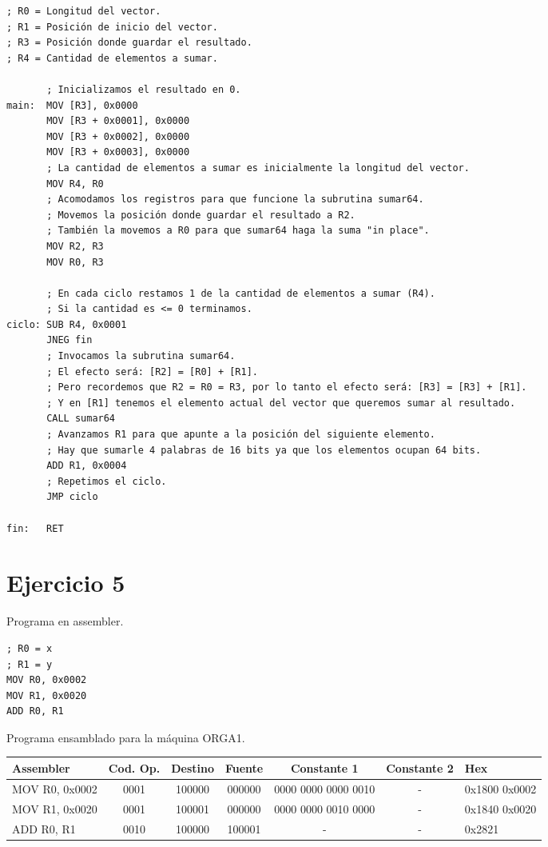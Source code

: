 \begin{lstlisting}
; R0 = Longitud del vector.
; R1 = Posición de inicio del vector.
; R3 = Posición donde guardar el resultado.
; R4 = Cantidad de elementos a sumar.

       ; Inicializamos el resultado en 0.
main:  MOV [R3], 0x0000
       MOV [R3 + 0x0001], 0x0000
       MOV [R3 + 0x0002], 0x0000
       MOV [R3 + 0x0003], 0x0000
       ; La cantidad de elementos a sumar es inicialmente la longitud del vector.
       MOV R4, R0
       ; Acomodamos los registros para que funcione la subrutina sumar64.
       ; Movemos la posición donde guardar el resultado a R2.
       ; También la movemos a R0 para que sumar64 haga la suma "in place".
       MOV R2, R3
       MOV R0, R3

       ; En cada ciclo restamos 1 de la cantidad de elementos a sumar (R4).
       ; Si la cantidad es <= 0 terminamos.
ciclo: SUB R4, 0x0001
       JNEG fin
       ; Invocamos la subrutina sumar64.
       ; El efecto será: [R2] = [R0] + [R1].
       ; Pero recordemos que R2 = R0 = R3, por lo tanto el efecto será: [R3] = [R3] + [R1].
       ; Y en [R1] tenemos el elemento actual del vector que queremos sumar al resultado.
       CALL sumar64
       ; Avanzamos R1 para que apunte a la posición del siguiente elemento.
       ; Hay que sumarle 4 palabras de 16 bits ya que los elementos ocupan 64 bits.
       ADD R1, 0x0004
       ; Repetimos el ciclo.
       JMP ciclo

fin:   RET
\end{lstlisting}

\section{Ejercicio 5}

Programa en assembler.

\begin{lstlisting}
; R0 = x
; R1 = y
MOV R0, 0x0002
MOV R1, 0x0020
ADD R0, R1
\end{lstlisting}

Programa ensamblado para la máquina ORGA1.

\begin{table}[ht]
\ttfamily\small
\begin{tabular}{|l|c|c|c|c|c|l|}
    Assembler & Cod. Op. & Destino & Fuente & Constante 1 & Constante 2 & Hex \\
    \hline
    MOV R0, 0x0002 & 0001 & 100000 & 000000 & 0000 0000 0000 0010 & - & 0x1800 0x0002 \\
    MOV R1, 0x0020 & 0001 & 100001 & 000000 & 0000 0000 0010 0000 & - & 0x1840 0x0020 \\
    ADD R0, R1 & 0010 & 100000 & 100001 & - & - & 0x2821 \\
\end{tabular}
\end{table}

